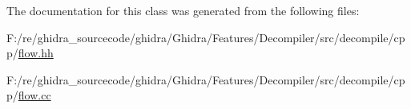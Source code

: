 The documentation for this class was generated from the following files\+:\begin{DoxyCompactItemize}
\item 
F\+:/re/ghidra\+\_\+sourcecode/ghidra/\+Ghidra/\+Features/\+Decompiler/src/decompile/cpp/\mbox{\hyperlink{flow_8hh}{flow.\+hh}}\item 
F\+:/re/ghidra\+\_\+sourcecode/ghidra/\+Ghidra/\+Features/\+Decompiler/src/decompile/cpp/\mbox{\hyperlink{flow_8cc}{flow.\+cc}}\end{DoxyCompactItemize}
